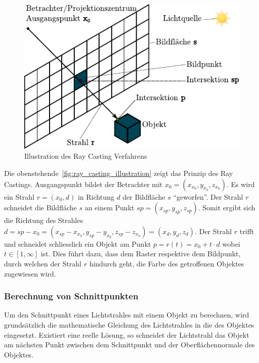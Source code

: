\begin{figure}[H]
    \centering
    \includegraphics{img/ray_casting.pdf}
    \caption{Illustration des Ray Casting Verfahrens\protect\footnotemark}\label{fig:ray_casting_illustration}
\end{figure}

Die obenstehende~\autoref{fig:ray_casting_illustration} zeigt das
Prinzip des Ray Castings. Ausgangspunkt bildet der Betrachter mit $x_{0}
= (x_{x_{0}}, y_{x_{0}}, z_{x_{0}})$. Es wird ein Strahl $r = (x_{0},
d)$ in Richtung $d$ der Bildfläche $s$ ``geworfen''. Der Strahl $r$
schneidet die Bildfläche $s$ an einem Punkt $sp = (x_{sp}, y_{sp},
z_{sp})$.  Somit ergibt sich die Richtung des Strahles $d = sp - x_{0} =
(x_{sp} - x_{x_{0}}, y_{sp} - y_{x_{0}}, z_{sp} - z_{x_{0}}) = (x_{d},
y_{d}, z_{d})$. Der Strahl $r$ trifft und schneidet schliesslich ein
Objekt am Punkt $p = r(t) = x_{0} + t \cdot d$ wobei $t \in [1, \infty]$
ist. Dies führt dazu, dass dem Raster respektive dem Bildpunkt, durch
welchen der Strahl $r$ hindurch geht, die Farbe des getroffenen Objektes
zugewiesen wird.

\subsubsection{Berechnung von Schnittpunkten}
\label{ssubsec:ray_casting_intersections}

Um den Schnittpunkt eines Lichtstrahles mit einem Objekt zu berechnen,
wird grundsätzlich die mathematische Gleichung des Lichtstrahles in die
des Objektes eingesetzt. Existiert eine reelle Lösung, so schneidet der
Lichtstrahl das Objekt am nächsten Punkt zwischen dem Schnittpunkt und
der Oberflächennormale des Objektes.


